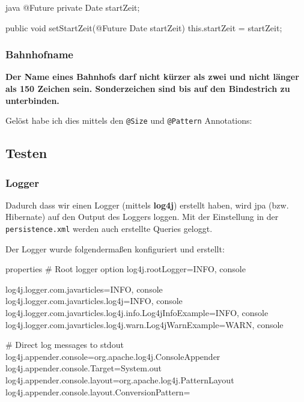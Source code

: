 \begin{code}{java}
@Future
private Date startZeit;

public void setStartZeit(@Future Date startZeit) {
    this.startZeit = startZeit;
}
\end{code}

\subsubsection{Bahnhofname}
\textbf{Der Name eines Bahnhofs darf nicht kürzer als zwei und nicht länger als 150 Zeichen sein. Sonderzeichen sind bis auf den Bindestrich zu unterbinden.}

Gelöst habe ich dies mittels den \texttt{@Size} und \texttt{@Pattern} Annotations:

\clearpage
\subsection{Testen}

\subsubsection{Logger}

Dadurch dass wir einen Logger (mittels \textbf{log4j}) erstellt haben, wird \gls{jpa} (bzw. Hibernate) auf den Output des Loggers loggen. Mit der Einstellung in der \texttt{persistence.xml} werden auch erstellte Queries geloggt.

Der Logger wurde folgendermaßen konfiguriert und erstellt:

\begin{code}{properties}
# Root logger option
log4j.rootLogger=INFO, console

log4j.logger.com.javarticles=INFO, console
log4j.logger.com.javarticles.log4j=INFO, console
log4j.logger.com.javarticles.log4j.info.Log4jInfoExample=INFO, console
log4j.logger.com.javarticles.log4j.warn.Log4jWarnExample=WARN, console

# Direct log messages to stdout
log4j.appender.console=org.apache.log4j.ConsoleAppender
log4j.appender.console.Target=System.out
log4j.appender.console.layout=org.apache.log4j.PatternLayout
log4j.appender.console.layout.ConversionPattern=%
\end{code}

